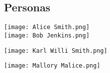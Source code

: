 \subsection{Personas}

\texttt{[image: Alice Smith.png]}
\\
\texttt{[image: Bob Jenkins.png]}

\texttt{[image: Karl Willi Smith.png]}

\texttt{[image: Mallory Malice.png]}

